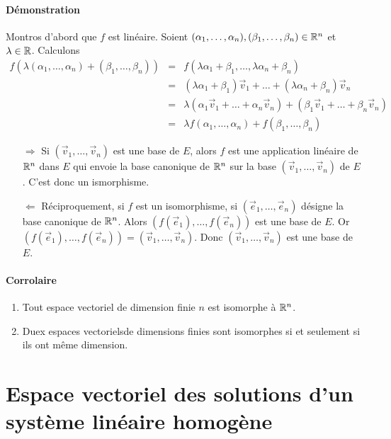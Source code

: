 \paragraph{Démonstration} 
Montros d'abord que $f$ est linéaire. Soient $(\alpha_1, \ldots, \alpha_n), (\beta_1, \ldots, \beta_n) \in \mathbb{R}^n$ et $ \lambda \in \mathbb{R}$. Calculons
\begin{eqnarray*}
  f(\lambda (\alpha_1, \ldots, \alpha_n) + (\beta_1, \ldots, \beta_n))
    &=& f( \lambda \alpha_1 + \beta_1, \ldots, \lambda \alpha_n + \beta_n) \\
    &=& (\lambda \alpha_1 + \beta_1) \vec{v}_1 + \ldots + (\lambda \alpha_n + \beta_n) \vec{v}_n \\
    &=& \lambda (\alpha_1 \vec{v}_1 + \ldots + \alpha_n \vec{v}_n) + (\beta_1 \vec{v}_1 + \ldots + \beta_n \vec{v}_n) \\
    &=& \lambda f(\alpha_1, \ldots, \alpha_n) + f(\beta_1, \ldots, \beta_n)
\end{eqnarray*}
\begin{itemize}
  \item[$\Rightarrow$] Si $(\vec{v}_1, \ldots, \vec{v}_n)$ est une base de $E$, alors $f$ est une application linéaire de $\mathbb{R}^n$ dans $E$ qui envoie la base canonique de $\mathbb{R}^n$ sur la base $(\vec{v}_1, \ldots, \vec{v}_n)$ de $E$. C'est donc un ismorphisme.
  
  \item[$\Leftarrow$] Réciproquement, si $f$ est un isomorphisme, si $(\vec{e}_1, \ldots, \vec{e}_n)$ désigne la base canonique de $\mathbb{R}^n$. Alors $(f(\vec{e}_1), \ldots, f(\vec{e}_n))$ est une base de $E$. Or $(f(\vec{e}_1), \ldots, f(\vec{e}_n)) = (\vec{v}_1, \ldots, \vec{v}_n)$. Donc $(\vec{v}_1, \ldots, \vec{v}_n)$ est une base de $E$.
\end{itemize}

\paragraph{Corrolaire}
\begin{enumerate}
  \item Tout espace vectoriel de dimension finie $n$ est isomorphe à $\mathbb{R}^n$.
  \item Duex espaces vectorielsde dimensions finies sont isomorphes si et seulement si ils ont même dimension.
\end{enumerate}

%
%
\section{Espace vectoriel des solutions d'un système linéaire homogène}
%
%

